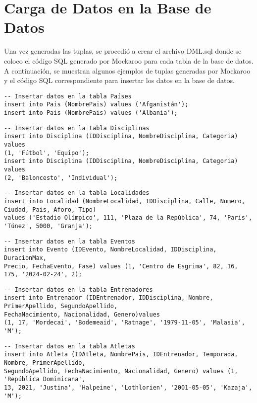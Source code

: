 \section*{Carga de Datos en la Base de Datos}

Una vez generadas las tuplas, se procedió a crear el archivo DML.sql donde se coloco el código SQL generado por Mockaroo para cada tabla de la base de datos. \\

A continuación, se muestran algunos ejemplos de tuplas generadas por Mockaroo y el código SQL correspondiente para insertar los datos en la base de datos. \\


\begin{verbatim}
-- Insertar datos en la tabla Países
insert into Pais (NombrePais) values ('Afganistán');
insert into Pais (NombrePais) values ('Albania');
\end{verbatim}

\begin{verbatim}
-- Insertar datos en la tabla Disciplinas
insert into Disciplina (IDDisciplina, NombreDisciplina, Categoria) values 
(1, 'Fútbol', 'Equipo');
insert into Disciplina (IDDisciplina, NombreDisciplina, Categoria) values 
(2, 'Baloncesto', 'Individual');
\end{verbatim}

\begin{verbatim}
-- Insertar datos en la tabla Localidades
insert into Localidad (NombreLocalidad, IDDisciplina, Calle, Numero, Ciudad, Pais, Aforo, Tipo) 
values ('Estadio Olímpico', 111, 'Plaza de la República', 74, 'París', 'Túnez', 5000, 'Granja');
\end{verbatim}

\begin{verbatim}
-- Insertar datos en la tabla Eventos
insert into Evento (IDEvento, NombreLocalidad, IDDisciplina, DuracionMax, 
Precio, FechaEvento, Fase) values (1, 'Centro de Esgrima', 82, 16, 175, '2024-02-24', 2);
\end{verbatim}

\begin{verbatim}
-- Insertar datos en la tabla Entrenadores
insert into Entrenador (IDEntrenador, IDDisciplina, Nombre, PrimerApellido, SegundoApellido, 
FechaNacimiento, Nacionalidad, Genero)values 
(1, 17, 'Mordecai', 'Bodemeaid', 'Ratnage', '1979-11-05', 'Malasia', 'M');
\end{verbatim}

\begin{verbatim}
-- Insertar datos en la tabla Atletas
insert into Atleta (IDAtleta, NombrePais, IDEntrenador, Temporada, Nombre, PrimerApellido,
SegundoApellido, FechaNacimiento, Nacionalidad, Genero) values (1, 'República Dominicana', 
13, 2021, 'Justina', 'Halpeine', 'Lothlorien', '2001-05-05', 'Kazaja', 'M');
\end{verbatim}

